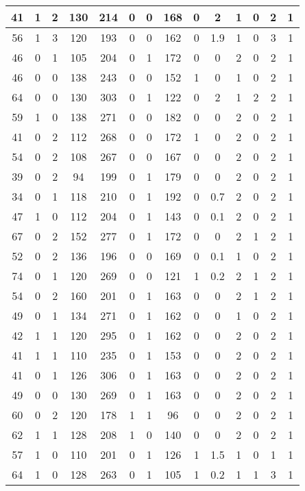 \documentclass{article}
\begin{document}
\begin{longtable}{|c|c|c|c|c|c|c|c|c|c|c|c|c|c|}
41 & 1 & 2 & 130 & 214 & 0 & 0 & 168 & 0 & 2 & 1 & 0 & 2 & 1\\ \hline
56 & 1 & 3 & 120 & 193 & 0 & 0 & 162 & 0 & 1.9 & 1 & 0 & 3 & 1\\ \hline
46 & 0 & 1 & 105 & 204 & 0 & 1 & 172 & 0 & 0 & 2 & 0 & 2 & 1\\ \hline
46 & 0 & 0 & 138 & 243 & 0 & 0 & 152 & 1 & 0 & 1 & 0 & 2 & 1\\ \hline
64 & 0 & 0 & 130 & 303 & 0 & 1 & 122 & 0 & 2 & 1 & 2 & 2 & 1\\ \hline
59 & 1 & 0 & 138 & 271 & 0 & 0 & 182 & 0 & 0 & 2 & 0 & 2 & 1\\ \hline
41 & 0 & 2 & 112 & 268 & 0 & 0 & 172 & 1 & 0 & 2 & 0 & 2 & 1\\ \hline
54 & 0 & 2 & 108 & 267 & 0 & 0 & 167 & 0 & 0 & 2 & 0 & 2 & 1\\ \hline
39 & 0 & 2 & 94 & 199 & 0 & 1 & 179 & 0 & 0 & 2 & 0 & 2 & 1\\ \hline
34 & 0 & 1 & 118 & 210 & 0 & 1 & 192 & 0 & 0.7 & 2 & 0 & 2 & 1\\ \hline
47 & 1 & 0 & 112 & 204 & 0 & 1 & 143 & 0 & 0.1 & 2 & 0 & 2 & 1\\ \hline
67 & 0 & 2 & 152 & 277 & 0 & 1 & 172 & 0 & 0 & 2 & 1 & 2 & 1\\ \hline
52 & 0 & 2 & 136 & 196 & 0 & 0 & 169 & 0 & 0.1 & 1 & 0 & 2 & 1\\ \hline
74 & 0 & 1 & 120 & 269 & 0 & 0 & 121 & 1 & 0.2 & 2 & 1 & 2 & 1\\ \hline
54 & 0 & 2 & 160 & 201 & 0 & 1 & 163 & 0 & 0 & 2 & 1 & 2 & 1\\ \hline
49 & 0 & 1 & 134 & 271 & 0 & 1 & 162 & 0 & 0 & 1 & 0 & 2 & 1\\ \hline
42 & 1 & 1 & 120 & 295 & 0 & 1 & 162 & 0 & 0 & 2 & 0 & 2 & 1\\ \hline
41 & 1 & 1 & 110 & 235 & 0 & 1 & 153 & 0 & 0 & 2 & 0 & 2 & 1\\ \hline
41 & 0 & 1 & 126 & 306 & 0 & 1 & 163 & 0 & 0 & 2 & 0 & 2 & 1\\ \hline
49 & 0 & 0 & 130 & 269 & 0 & 1 & 163 & 0 & 0 & 2 & 0 & 2 & 1\\ \hline
60 & 0 & 2 & 120 & 178 & 1 & 1 & 96 & 0 & 0 & 2 & 0 & 2 & 1\\ \hline
62 & 1 & 1 & 128 & 208 & 1 & 0 & 140 & 0 & 0 & 2 & 0 & 2 & 1\\ \hline
57 & 1 & 0 & 110 & 201 & 0 & 1 & 126 & 1 & 1.5 & 1 & 0 & 1 & 1\\ \hline
64 & 1 & 0 & 128 & 263 & 0 & 1 & 105 & 1 & 0.2 & 1 & 1 & 3 & 1\\ \hline

\end{longtable}
\end{document}
